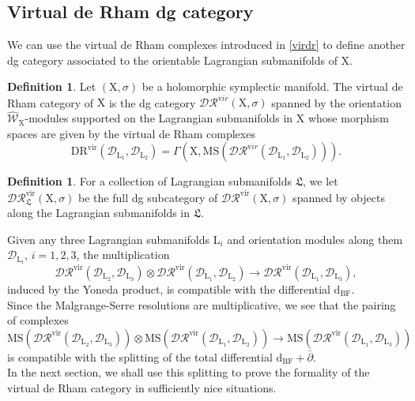 \documentclass{article}
\theoremstyle{plain}
\theoremstyle{definition}
\newtheorem{definition}[theorem]{Definition}
\theoremstyle{remark}
\newcommand{\mr}{\mathrm}
\newcommand{\MS}{\mr{MS}}
\newcommand{\3}{\vspace{3mm}}
\newcommand{\2}{\vspace{2mm}}
\newcommand{\1}{\vspace{1mm}}
\begin{document}
\subsection{Virtual de Rham dg category}
We can use the virtual de Rham complexes introduced in \cref{virdr} to define another dg category associated to the orientable Lagrangian submanifolds of $\mr{X}$. 
\2
\begin{definition}
Let $(\mr{X},\sigma)$ be a holomorphic symplectic manifold. The virtual de Rham category of $\mr{X}$ is the dg category $\mathcal{DR}^{\mr vir}(\mr{X},\sigma)$ spanned by the orientation $\widehat{\mathscr{W}}_\mr{X}$-modules supported on the Lagrangian submanifolds in $\mr{X}$ whose morphism spaces are given by the virtual de Rham complexes $$\mr{DR}^{\mr{vir}}\left(\mathscr{D}_{\mr{L}_1},\mathscr{D}_{\mr{L}_2}\right)=\Gamma\left(\mr{X},\mr{MS}\left(\mathscr{DR}^{\mr vir}(\mathscr{D}_{\mr{L}_1},\mathscr{D}_{\mr{L}_2})\right)\right).$$
\end{definition}
\2
\begin{definition}
For a collection of Lagrangian submanifolds $\mathfrak{L}$, we let $\mathcal{DR}^{\mr{vir}}_\mathfrak{L}(\mr{X},\sigma)$ be the full dg subcategory of $\mathcal{DR}^{\mr{vir}}(\mr{X},\sigma)$ spanned by objects along the Lagrangian submanifolds in $\mathfrak{L}$.
\end{definition}
Given any three Lagrangian submanifolds $\mr{L}_i$ and orientation modules along them $\mathscr{D}_{\mr{L}_i}$, $i=1,2,3$, the multiplication $$\mathscr{DR}^{\mr{vir}}\left(\mathscr{D}_{\mr{L}_2},\mathscr{D}_{\mr{L}_3}\right)\otimes \mathscr{DR}^{\mr{vir}}\left(\mathscr{D}_{\mr{L}_1},\mathscr{D}_{\mr{L}_2}\right) \to \mathscr{DR}^{\mr{vir}}\left(\mathscr{D}_{\mr{L}_1},\mathscr{D}_{\mr{L}_3}\right),$$ induced by the Yoneda product, is compatible with the differential $\mr{d}_\mr{BF}$.\\
Since the Malgrange-Serre resolutions are multiplicative, we see that the pairing of complexes $$\MS\left(\mathscr{DR}^{\mr{vir}}\left(\mathscr{D}_{\mr{L}_2},\mathscr{D}_{\mr{L}_3}\right)\right)\otimes \MS\left(\mathscr{DR}^{\mr{vir}}\left(\mathscr{D}_{\mr{L}_1},\mathscr{D}_{\mr{L}_2}\right)\right) \to \MS\left(\mathscr{DR}^{\mr{vir}}\left(\mathscr{D}_{\mr{L}_1},\mathscr{D}_{\mr{L}_3}\right)\right)$$ is compatible with the splitting of the total differential $\mr{d}_\mr{BF}+\bar{\partial}$.\\
In the next section, we shall use this splitting to prove the formality of the virtual de Rham category in sufficiently nice situations. 
\end{document}
